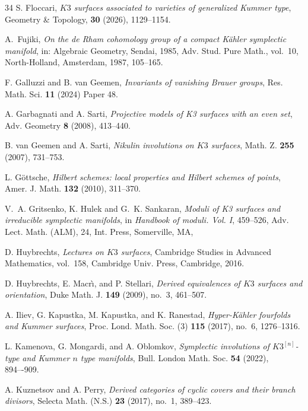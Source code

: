 \documentclass{amsart}
\theoremstyle{definition}
\numberwithin{equation}{section}
\numberwithin{equation}{section} \theoremstyle{definition}
\begin{document}
\begin{thebibliography}{34}
 S. Floccari,
  \emph{$K3$ surfaces associated to varieties of generalized Kummer type},
  Geometry \& Topology, {\bf 30} (2026), 1129--1154.  

A.~Fujiki, \emph{On the de {R}ham cohomology group of a compact {K}\"ahler
symplectic manifold}, in: Algebraic Geometry, {S}endai, 1985,
Adv. Stud. Pure Math., vol.~10, North-Holland, Amsterdam, 1987, 105--165.
  

 F. Galluzzi and B. van Geemen,
  \emph{Invariants of vanishing Brauer groups}, Res. Math. Sci. {\bf 11} (2024) Paper 48.

 A. Garbagnati and A. Sarti, \emph{Projective models of K3 surfaces with an even set}, Adv. Geometry {\bf 8} (2008), 413--440.

 B. van Geemen and A. Sarti,
  \emph{Nikulin involutions on $K3$ surfaces}, Math. Z. {\bf 255} (2007),
  731--753.

 L. G\"ottsche,
  \emph{Hilbert schemes: local properties and Hilbert schemes of points},
  Amer. J. Math. {\bf 132} (2010), 311--370.

 V.~A. Gritsenko, K. Hulek and G.~K. Sankaran, \emph{Moduli of K3 surfaces and irreducible symplectic manifolds}, in {\it Handbook of moduli. Vol. I}, 459--526, Adv. Lect. Math. (ALM), 24, Int. Press, Somerville, MA,


 D. Huybrechts,
  \emph{Lectures on $K3$ surfaces}, Cambridge Studies in Advanced Mathematics,
  vol.~158, Cambridge Univ. Press, Cambridge, 2016.

 D. Huybrechts, E. Macr\`\i, and P. Stellari,
  \emph{Derived equivalences of $K3$ surfaces and orientation},
  Duke Math. J. {\bf 149} (2009), no.~3, 461--507. %


 A. Iliev, G. Kapustka, M. Kapustka, and K. Ranestad,
  \emph{Hyper-K\"ahler fourfolds and Kummer surfaces},
  Proc. Lond. Math. Soc. (3) {\bf 115} (2017), no.~6, 1276--1316.

 L. Kamenova, G. Mongardi, and A. Oblomkov,
  \emph{Symplectic involutions of $K3^{[n]}$-type and Kummer $n$ type
  manifolds}, Bull. London Math. Soc. {\bf 54} (2022), 894–-909.

 A. Kuznetsov and A. Perry,
  \emph{Derived categories of cyclic covers and their branch divisors},
  Selecta Math. (N.S.) {\bf 23} (2017), no.~1, 389--423.


\end{thebibliography}
\end{document}
